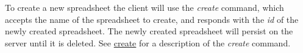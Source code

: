 To create a new spreadsheet the client will use the \emph{create} command, 
which accepts the name of the spreadsheet to create, and responds with the 
\emph{id} of the newly created spreadsheet. The newly created spreadsheet 
will persist on the server until it is deleted. See \hyperref[sec:message:create]{create} 
for a description of the \emph{create} command.

